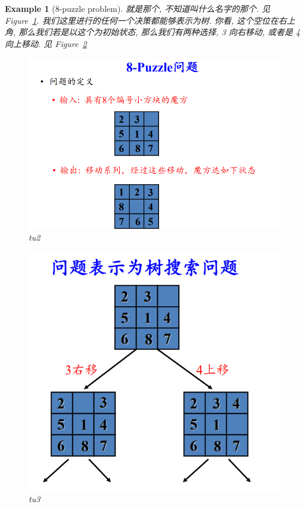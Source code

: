 \documentclass[a4paper, 10pt]{ctexart} %
\newtheorem{example}{Example}
\begin{document}
\begin{example}[8-puzzle problem]
    就是那个, 不知道叫什么名字的那个. 见 Figure~\ref{tu2}. 我们这里进行的任何一个决策都能够表示为树. 
    你看, 这个空位在右上角, 那么我们若是以这个为初始状态, 
    那么我们有两种选择, 3 向右移动, 或者是 4 向上移动. 见 Figure~\ref{tu3}
    \begin{figure}
        \centering
        \includegraphics[scale = 0.5]{ss6.png}
        \caption{tu2}
        \label{tu2}
    \end{figure}
    \begin{figure}
        \centering
        \includegraphics[scale = 0.5]{说是.png}
        \caption{tu3}
        \label{tu3}
    \end{figure}
\end{example}
\end{document}
